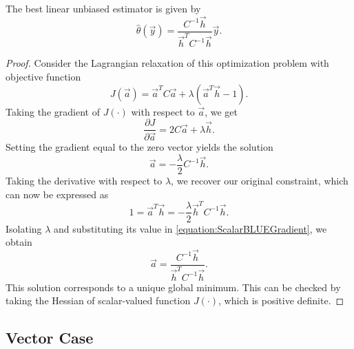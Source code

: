 \begin{theorem}
The best linear unbiased estimator is given by
\begin{equation*}
\hat{\theta} (\vec{y}) = \frac{C^{-1} \vec{h}}{\vec{h}^T C^{-1} \vec{h}} \vec{y} .
\end{equation*}
\end{theorem}
\begin{proof}
Consider the Lagrangian relaxation of this optimization problem with objective function
\begin{equation*}
J (\vec{a}) =
\vec{a}^T C \vec{a} + \lambda \left( \vec{a}^T \vec{h} - 1 \right) .
\end{equation*}
Taking the gradient of $J(\cdot)$ with respect to $\vec{a}$, we get
\begin{equation*}
\frac{\partial J}{\partial \vec{a}} = 2 C \vec{a} + \lambda \vec{h} .
\end{equation*}
Setting the gradient equal to the zero vector yields the solution
\begin{equation} \label{equation:ScalarBLUEGradient}
\vec{a} = - \frac{\lambda}{2} C^{-1} \vec{h} .
\end{equation}
Taking the derivative with respect to $\lambda$, we recover our original constraint, which can now be expressed as
\begin{equation*}
1 = \vec{a}^T \vec{h} = - \frac{\lambda}{2} \vec{h}^T C^{-1} \vec{h} .
\end{equation*}
Isolating $\lambda$ and substituting its value in \eqref{equation:ScalarBLUEGradient}, we obtain
\begin{equation}
\vec{a} = \frac{C^{-1} \vec{h}}{\vec{h}^T C^{-1} \vec{h}} .
\end{equation}
This solution corresponds to a unique global minimum.
This can be checked by taking the Hessian of scalar-valued function $J(\cdot)$, which is positive definite.
\end{proof}


\subsection{Vector Case}

